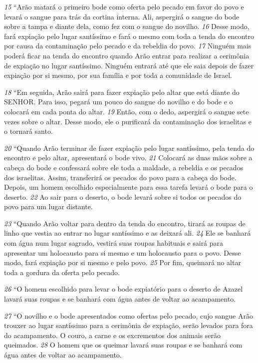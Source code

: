 \smallskip
\textit{\tiny 15}
“Arão matará o primeiro bode como oferta pelo pecado em favor do povo e
levará o sangue para trás da cortina interna. Ali, aspergirá o sangue do bode sobre
a tampa e diante dela, como fez com o sangue do novilho. 
\textit{\tiny 16}
Desse modo, fará
expiação pelo lugar santíssimo e fará o mesmo com toda a tenda do encontro por
causa da contaminação pelo pecado e da rebeldia do povo. 
\textit{\tiny 17}
Ninguém mais
poderá ficar na tenda do encontro quando Arão entrar para realizar a cerimônia
de expiação no lugar santíssimo. Ninguém entrará até que ele saia depois de fazer
expiação por si mesmo, por sua família e por toda a comunidade de Israel.

\smallskip   
\textit{\tiny 18}
“Em seguida, Arão sairá para fazer expiação pelo altar que está diante do
SENHOR. Para isso, pegará um pouco do sangue do novilho e do bode e o colocará
em cada ponta do altar. 
\textit{\tiny 19}
Então, com o dedo, aspergirá o sangue sete vezes sobre
o altar. Desse modo, ele o purificará da contaminação dos israelitas e o tornará
santo.

\smallskip   
\textit{\tiny 20}
“Quando Arão terminar de fazer expiação pelo lugar santíssimo, pela tenda
do encontro e pelo altar, apresentará o bode vivo. 
\textit{\tiny 21}
Colocará as duas mãos sobre a
cabeça do bode e confessará sobre ele toda a maldade, a rebeldia e os pecados dos
israelitas. Assim, transferirá os pecados do povo para a cabeça do bode. Depois,
um homem escolhido especialmente para essa tarefa levará o bode para o
deserto. 
\textit{\tiny 22}
Ao sair para o deserto, o bode levará sobre si todos os pecados do povo
para um lugar distante.
   
\smallskip   
\textit{\tiny 23}
“Quando Arão voltar para dentro da tenda do encontro, tirará as roupas de
linho que vestia ao entrar no lugar santíssimo e as deixará ali. 
\textit{\tiny 24}
Ele se banhará
com água num lugar sagrado, vestirá suas roupas habituais e sairá para apresentar
um holocausto para si mesmo e um holocausto para o povo. Desse modo, fará
expiação por si mesmo e pelo povo. 
\textit{\tiny 25}
Por fim, queimará no altar toda a gordura
da oferta pelo pecado.
   
\smallskip   
\textit{\tiny 26}
“O homem escolhido para levar o bode expiatório para o deserto de Azazel
lavará suas roupas e se banhará com água antes de voltar ao acampamento.
   
\smallskip   
\textit{\tiny 27}
“O novilho e o bode apresentados como ofertas pelo pecado, cujo sangue
Arão trouxer ao lugar santíssimo para a cerimônia de expiação, serão levados para
fora do acampamento. O couro, a carne e os excrementos dos animais serão
queimados. 
\textit{\tiny 28}
O homem que os queimar lavará suas roupas e se banhará com
água antes de voltar ao acampamento.

